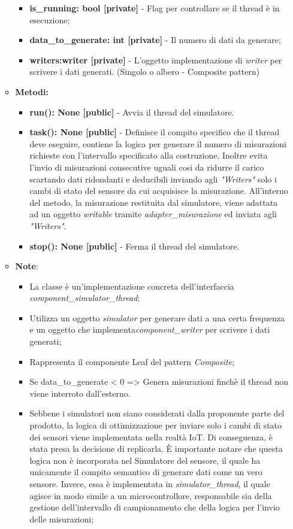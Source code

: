 \begin{itemize}
\begin{itemize}
\begin{itemize}
            \item \textbf{is\_running: bool [private]} - Flag per controllare se il thread è in esecuzione;
            \item \textbf{data\_to\_generate: int [private]} - Il numero di dati da generare;
            \item \textbf{writers:writer [private]} - L'oggetto implementazione di \textit{writer} per scrivere i dati generati. (Singolo o albero - Composite pattern)
        \end{itemize}
        \item \textbf{Metodi: }
        \begin{itemize}
            \item \textbf{run(): None [public]} - Avvia il thread del simulatore.
            \item \textbf{task(): None [public]} - Definisce il compito specifico che il thread deve eseguire, contiene la logica per generare il numero di misurazioni richieste con l'intervallo specificato alla costruzione.
            Inoltre evita l'invio di misurazioni consecutive uguali cosi da ridurre il carico scartando dati ridondanti e deducibili inviando agli \textit{"Writers"} solo i cambi di stato del sensore da cui acquisisce la misurazione.
            All'interno del metodo, la misurazione restituita dal simulatore, viene adattata ad un oggetto \textit{writable} tramite \textit{adapter\_misurazione} ed inviata agli \textit{"Writers"}.
            \item \textbf{stop(): None [public]} - Ferma il thread del simulatore.
        \end{itemize}
        \item\textbf{Note}:
        \begin{itemize}
            \item La classe è un'implementazione concreta dell'interfaccia \textit{component\_simulator\_thread};
            \item Utilizza un oggetto \textit{\textit{simulator}} per generare dati a una certa frequenza e un oggetto che implementa\textit{component\_writer} per scrivere i dati generati;
            \item Rappresenta il componente Leaf del pattern \textit{Composite};
            \item Se data\_to\_generate < 0 => Genera misurazioni finchè il thread non viene interroto dall'esterno.
            \item Sebbene i simulatori non siano considerati dalla proponente parte del prodotto, la logica di ottimizzazione per inviare solo i cambi di stato dei sensori viene implementata nella realtà IoT. Di conseguenza, è stata presa la decisione di replicarla. È importante notare che questa logica non è incorporata nel Simulatore del sensore, il quale ha unicamente il compito semantico di generare dati come un vero sensore. Invece, essa è implementata in \textit{simulator\_thread}, il quale agisce in modo simile a un microcontrollore, responsabile sia della gestione dell'intervallo di campionamento che della logica per l'invio delle misurazioni;

\end{itemize}
\end{itemize}
\end{itemize}
